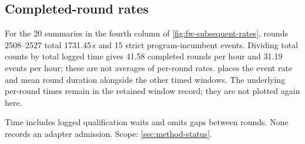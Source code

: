 \subsection{Completed-round rates}\label{app:subsequent-rates}

For the 20 summaries in the fourth column of \cref{fig:fw-subsequent-rates},
rounds 2508--2527 total \num{1731.45}\,s and 15 strict program-incumbent
events. Dividing total counts by total logged time gives 41.58 completed
rounds per hour and 31.19 events per hour; these are not averages of per-round rates.
 places the event rate and mean round duration
alongside the other timed windows. The underlying per-round times remain
in the retained window record; they are not plotted again here.

Time includes logged qualification waits and omits gaps between
rounds. None records an adapter admission. Scope: \cref{sec:method-status}.
